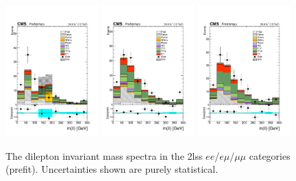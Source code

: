 \begin{figure}[htp]
\centering
\includegraphics[width=0.32\textwidth]{ch5_figs/mll_ttH_ee_stackPlot_SR.pdf}
\includegraphics[width=0.32\textwidth]{ch5_figs/mll_ttH_em_stackPlot_SR.pdf}
\includegraphics[width=0.32\textwidth]{ch5_figs/mll_ttH_mm_stackPlot_SR.pdf} \\
\caption[Data/MC comparison of dilepton invariant mass spectra in the signal region]{The dilepton invariant mass spectra in the 2lss $ee$/$e\mu$/$\mu\mu$ categories (prefit). Uncertainties shown are purely statistical.}
\label{fig:sr_mll}
\end{figure}

